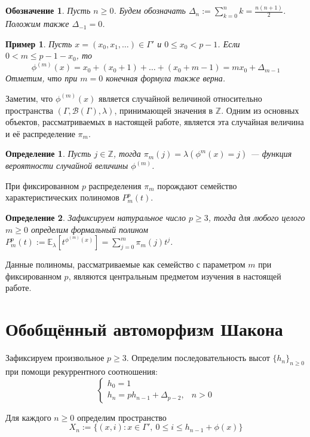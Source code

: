 \documentclass[14pt, a4paper, russian]{report}
\newtheorem{definition}{\indent Определение}
\newtheorem{example}{\indent Пример}
\newtheorem{notation}{\indent Обозначение}
\begin{document}
\begin{notation}
Пусть $n \ge 0$. Будем обозначать $\Delta_n := \sum\limits_{k=0}^{n}k = \frac{n(n+1)}{2}$. Положим также $\Delta_{-1} = 0$.
\end{notation}

\begin{example}\label{phi_delta}
Пусть $x = (x_0, x_1, \ldots) \in \Gamma'$ и $0 \le x_0 < p-1$. Если $0 < m \le p-1-x_0$, то $$\phi^{(m)}(x) = x_0 + (x_0 + 1) + \ldots + (x_0 + m - 1) = mx_0 + \Delta_{m-1}$$
Отметим, что при $m=0$ конечная формула также верна.
\end{example}

Заметим, что $\phi^{(m)}(x)$ является случайной величиной относительно пространства $(\Gamma, \mathcal{B}(\Gamma), \lambda)$, принимающей значения в $\mathbb{Z}$. Одним из основных объектов, рассматриваемых в настоящей работе, является эта случайная величина и её распределение $\pi_m$.
\begin{definition}\label{pi_m}
Пусть $j \in \mathbb{Z}$, тогда $\pi_m(j)=\lambda(\phi^{m}(x)=j)$ --- функция вероятности случайной величины $\phi^{(m)}$.
\end{definition}

При фиксированном $p$ распределения $\pi_m$ порождают семейство характеристических полиномов $P_m^p(t)$.

\begin{definition}\label{poly}
Зафиксируем натуральное число $p \ge 3$, тогда для любого целого $m \ge 0$ определим формальный полином $P_m^p(t):= \mathbb{E}_\lambda\left[ t^{\phi^{(m)}(x)}\right] = \sum\limits_{j=0}^m \pi_m(j) t^j$.
\end{definition}

Данные полиномы, рассматриваемые как семейство с параметром $m$ при фиксированном $p$, являются центральным предметом изучения в настоящей работе.

\section{Обобщённый автоморфизм Шакона}

Зафиксируем произвольное $p \ge 3$. Определим последовательность высот $\{h_n\}_{n \ge 0}$ при помощи рекуррентного соотношения:
$$\begin{cases}
h_0 = 1 \\
h_n = p h_{n-1}+\Delta_{p-2},& n > 0 
\end{cases}$$

Для каждого $n \ge 0$ определим пространство
$$X_n:=\{(x,i): x \in \Gamma',\ 0 \le i \le h_{n-1} + \phi(x)\}$$
\end{document}

